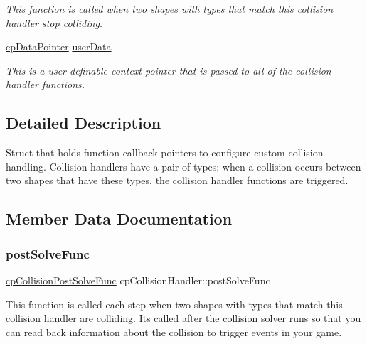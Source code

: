 \begin{DoxyCompactItemize}
\begin{DoxyCompactList}\small\item\em This function is called when two shapes with types that match this collision handler stop colliding. \end{DoxyCompactList}\item 
\mbox{\label{structcp_collision_handler_af2b874e87431e407a4045cb90d999b8a}} 
\mbox{\hyperlink{group__basic_types_ga2ac2c3c31e21893941f9e4f8ee279447}{cp\+Data\+Pointer}} \mbox{\hyperlink{structcp_collision_handler_af2b874e87431e407a4045cb90d999b8a}{user\+Data}}
\begin{DoxyCompactList}\small\item\em This is a user definable context pointer that is passed to all of the collision handler functions. \end{DoxyCompactList}\end{DoxyCompactItemize}


\subsection{Detailed Description}
Struct that holds function callback pointers to configure custom collision handling. Collision handlers have a pair of types; when a collision occurs between two shapes that have these types, the collision handler functions are triggered. 

\subsection{Member Data Documentation}
\mbox{\label{structcp_collision_handler_adc3df1896d48519cc5359c51bd67ac98}} 
\subsubsection{\texorpdfstring{post\+Solve\+Func}{postSolveFunc}}
{\footnotesize\ttfamily \mbox{\hyperlink{group__cp_space_gaccb60bbb090c97823f49ee49e4e5d3c3}{cp\+Collision\+Post\+Solve\+Func}} cp\+Collision\+Handler\+::post\+Solve\+Func}

This function is called each step when two shapes with types that match this collision handler are colliding. It\textquotesingle{}s called after the collision solver runs so that you can read back information about the collision to trigger events in your game. \mbox{\label{structcp_collision_handler_aff35bdeedae80600cbbb1a68682a7431}} 

